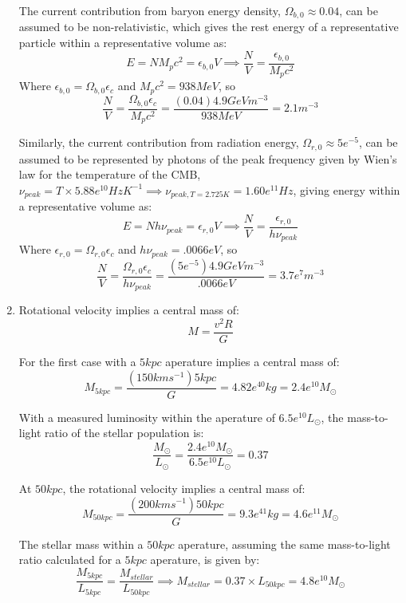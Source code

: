 \documentclass{paper}
\begin{document}
\begin{enumerate}
      The current contribution from baryon energy density, 
      \(\Omega_{b,0} \approx 0.04\), can be assumed to be non-relativistic,
      which gives the rest energy of a representative particle within a 
      representative volume as:
      \[
        E = N M_p c^2 = \epsilon_{b,0} V \implies 
        \frac{N}{V} = \frac{\epsilon_{b,0}}{M_p c^2}
      \]
      Where \( \epsilon_{b,0} = \Omega_{b,0}\epsilon_c \) and
      \( M_p c^2 = 938 \si{MeV} \), so
      \[
        \frac{N}{V} = \frac{\Omega_{b,0}\epsilon_c}{M_p c^2}
        = \frac{(0.04)4.9 \si{GeV m^{-3}}}{938 \si{MeV}} = 2.1 \si{m^{-3}}
      \]

      Similarly, the current contribution from radiation energy,
      \(\Omega_{r,0} \approx 5e^{-5}\), can be assumed to be represented
      by photons of the peak frequency given by Wien's law for the
      temperature of the CMB, 
      \(\nu_{peak} = T \times 5.88e^{10} \si{Hz K^{-1}} \implies
      \nu_{peak,T=2.725\si{K}} = 1.60e^{11} \si{Hz} \), giving energy
      within a representative volume as:
      \[
        E = N h \nu_{peak} = \epsilon_{r,0} V \implies
        \frac{N}{V} = \frac{\epsilon_{r,0}}{h \nu_{peak}}
      \]
      Where \( \epsilon_{r,0} = \Omega_{r,0}\epsilon_c \) and
      \( h \nu_{peak} = .0066 \si{eV} \), so 
      \[
        \frac{N}{V} = \frac{\Omega_{r,0}\epsilon_c}{h \nu_{peak}}
        = \frac{(5e^{-5})4.9 \si{GeV m^{-3}}}{.0066 \si{eV}} 
        = 3.7e^{7} \si{m^{-3}}
      \]

    \item
      Rotational velocity implies a central mass of:
      \[
        M = \frac{v^2R}{G}
      \]
      
      For the first case with a \(5\si{kpc}\) aperature implies a central
      mass of:
      \[
        M_{5\si{kpc}} = \frac{(150\si{km s^{-1}}) 5 \si{kpc}}{G}
        = 4.82e^{40} \si{kg} = 2.4e^{10} \si{M_{\odot}}
      \]

      With a measured luminosity within the aperature of 
      \(6.5e^{10}L_{\odot}\), the mass-to-light ratio of the stellar
      population is:
      \[
        \frac{M_{\odot}}{L_{\odot}} 
        = \frac{2.4e^{10}\si{M_{\odot}}}{6.5e^{10}\si{L_{\odot}}} = 0.37
      \]

      At \(50\si{kpc}\), the rotational velocity implies a central mass of:
      \[
        M_{50\si{kpc}} = \frac{(200\si{km s^{-1}}) 50 \si{kpc}}{G}
        = 9.3e^{41} \si{kg} = 4.6e^{11} \si{M_{\odot}}
      \]

      The stellar mass within a \(50 \si{kpc}\) aperature, assuming the same
      mass-to-light ratio calculated for a \(5 \si{kpc}\) aperature, is given
      by:
      \[
        \frac{M_{5 \si{kpc}}}{L_{5 \si{kpc}}} = 
        \frac{M_{stellar}}{L_{50 \si{kpc}}} \implies
        M_{stellar} = 0.37 \times L_{50 \si{kpc}} = 4.8e^{10}M_{\odot}
      \]


\end{enumerate}
\end{document}

